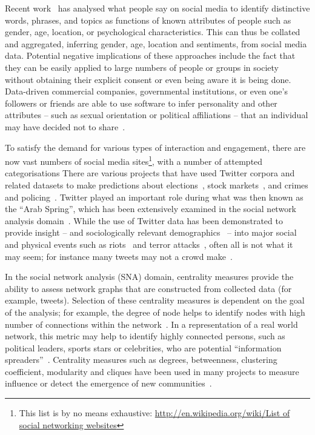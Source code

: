 \documentclass[conference]{IEEEtran}
\begin{document}
Recent
work~\cite{blamey-et-al-2012,schwartz-et-al:2013,blamey-et-al-2013,oatley+crick:2014,oatley-et-al-soccogcomp2015}
has analysed what people say on social media to identify distinctive
words, phrases, and topics as functions of known attributes of people
such as gender, age, location, or psychological characteristics. This
can thus be collated and aggregated, inferring gender, age, location
and sentiments, from social media data. Potential negative
implications of these approaches include the fact that they can be
easily applied to large numbers of people or groups in society without
obtaining their explicit consent or even being aware it is being
done. Data-driven commercial companies, governmental institutions, or
even one's followers or friends are able to use software to infer
personality and other attributes -- such as sexual orientation or
political affiliations -- that an individual may have decided not to
share~\cite{lambiotte+kosinski:2014,postsm:2014}.

To satisfy the demand for various types of interaction and engagement,
there are now vast numbers of social media sites\footnote{This list is
by no means exhaustive: \url{http://en.wikipedia.org/wiki/List of
social networking websites}}, with a number of attempted
categorisations There are various projects that have used Twitter
corpora and related datasets to make predictions about
elections~\cite{tumasjan-et-al:2010}, stock
markets~\cite{zhang-et-al:2011}, and crimes and
policing~\cite{gerber:2014,oatley+crick_fosintsi2014,oatley+crick:2015}. Twitter
played an important role during what was then known as the ``Arab
Spring'', which has been extensively examined in the social network
analysis
domain~\cite{lotan-et-al:2011,howard-et-al:2011,comunello+anzera:2012,wolfsfeld-et-al:2013,bruns-et-al:2013}.
While the use of Twitter data has been demonstrated to provide insight
-- and sociologically relevant demographics~\cite{sloan-et-al:2013} --
into major social and physical events such as
riots~\cite{procter-et-al:2013} and terror
attacks~\cite{burnap-et-al:2014}, often all is not what it may seem;
for instance many tweets may not a crowd make~\cite{liang-et-al:2013}.

In the social network analysis (SNA) domain, centrality measures
provide the ability to assess network graphs that are constructed from
collected data (for example, tweets). Selection of these centrality
measures is dependent on the goal of the analysis; for example, the
degree of node helps to identify nodes with high number of connections
within the
network~\cite{borgatti+everett:2000,rombach-et-al:2014,liu-et-al:2014}.
In a representation of a real world network, this metric may help to
identify highly connected persons, such as political leaders, sports
stars or celebrities, who are potential ``information
spreaders''~\cite{cha-et-al:2012,borge-holthoefer-et-al:2012,zhang-et-al:2016}.
Centrality measures such as degrees, betweenness, clustering
coefficient, modularity and cliques have been used in many projects to
measure influence or detect the emergence of new
communities~\cite{willis-et-al:2015,oatley+crick:2015}.
\end{document}
